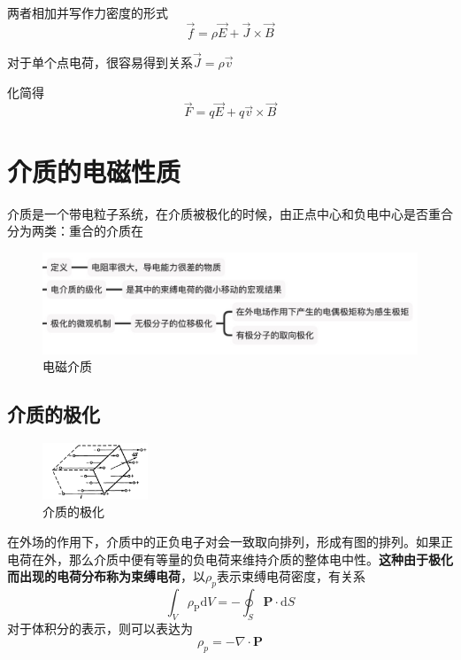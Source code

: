 		两者相加并写作力密度的形式
			\begin{equation}
			\vec{f}=\rho \vec{E}+\vec{J} \times \vec{B}
			\end{equation}

		对于单个点电荷，很容易得到关系$\vec{J}=\rho \vec{v}$

		化简得
			\begin{equation}
				\vec{F}=q \vec{E}+q \vec{v} \times \vec{B}
			\end{equation}

\section{介质的电磁性质}
	介质是一个带电粒子系统，在介质被极化的时候，由正点中心和负电中心是否重合分为两类：重合的介质在
		\begin{figure}[H]
			\centering  %
			\includegraphics[width=0.8\linewidth]{figs/电磁介质.jpg}
			\caption{电磁介质} %
			\label{fig.电磁介质}
		\end{figure}

	\subsection{介质的极化}
		\begin{figure}%
      		\centering
      		\includegraphics[width=0.28\textwidth]{figs/介质极化示意图.jpeg}
      		\caption{介质的极化}
      		\label{fig.介质的极化}
      		\end{figure}
      		在外场的作用下，介质中的正负电子对会一致取向排列，形成有图的排列。如果正电荷在外，那么介质中便有等量的负电荷来维持介质的整体电中性。\textbf{这种由于极化而出现的电荷分布称为束缚电荷}，以$\rho_p$表示束缚电荷密度，有关系
		\begin{equation}
			\int_{V} \rho_{\mathrm{P}} \mathrm{d} V=-\oint_{S} \boldsymbol{P} \cdot \mathrm{d} S
		\end{equation}
		对于体积分的表示，则可以表达为
			\begin{equation}
			\rho_p=- \nabla \cdot \mathbf{P}
			\end{equation}
		
